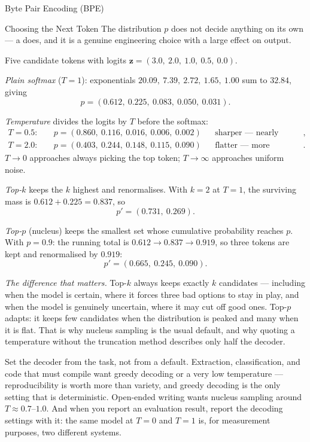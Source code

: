 \begin{v3topic}{Byte Pair Encoding (BPE)}
\begin{v3topic}{Choosing the Next Token}
The distribution $p$ does not decide anything on its own --- a  does, and it is a genuine engineering choice with a large effect on
output.

\begin{workedexample}
Five candidate tokens with logits $\mathbf{z} = (3.0,\ 2.0,\ 1.0,\ 0.5,\ 0.0)$.

\emph{Plain softmax} ($T=1$): exponentials $20.09,\ 7.39,\ 2.72,\ 1.65,\ 1.00$
sum to $32.84$, giving
\[
  p = (0.612,\ 0.225,\ 0.083,\ 0.050,\ 0.031).
\]

\emph{Temperature} divides the logits by $T$ before the softmax:
\[
\begin{aligned}
  T = 0.5:\quad & p = (0.860,\ 0.116,\ 0.016,\ 0.006,\ 0.002)
    &&\text{sharper --- nearly deterministic},\\
  T = 2.0:\quad & p = (0.403,\ 0.244,\ 0.148,\ 0.115,\ 0.090)
    &&\text{flatter --- more adventurous}.
\end{aligned}
\]
$T\to0$ approaches always picking the top token; $T\to\infty$ approaches
uniform noise.

\emph{Top-$k$} keeps the $k$ highest and renormalises. With $k=2$ at $T=1$, the
surviving mass is $0.612+0.225 = 0.837$, so
\[
  p' = (0.731,\ 0.269).
\]

\emph{Top-$p$} (nucleus) keeps the smallest set whose cumulative probability
reaches $p$. With $p = 0.9$: the running total is
$0.612 \to 0.837 \to 0.919$, so three tokens are kept and renormalised by
$0.919$:
\[
  p' = (0.665,\ 0.245,\ 0.090).
\]

\emph{The difference that matters.} Top-$k$ always keeps exactly $k$ candidates
--- including when the model is certain, where it forces three bad options to
stay in play, and when the model is genuinely uncertain, where it may cut off
good ones. Top-$p$ adapts: it keeps few candidates when the distribution is
peaked and many when it is flat. That is why nucleus sampling is the usual
default, and why quoting a temperature without the truncation method describes
only half the decoder.
\end{workedexample}

\begin{engineernote}
Set the decoder from the task, not from a default. Extraction, classification,
and code that must compile want greedy decoding or a very low temperature ---
reproducibility is worth more than variety, and greedy decoding is the only
setting that is deterministic. Open-ended writing wants nucleus sampling around
$T \approx 0.7$--$1.0$. And when you report an evaluation result, report the
decoding settings with it: the same model at $T = 0$ and $T = 1$ is, for
measurement purposes, two different systems.
\end{engineernote}
\end{v3topic}


\end{v3topic}
